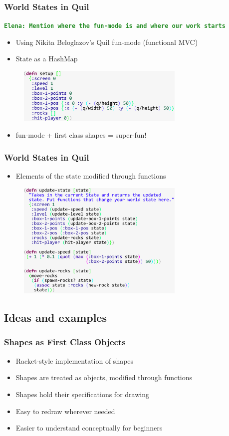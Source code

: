 \documentclass{beamer}
\newcommand{\comment}[1]{{\bf \tt  {#1}}}
\newcommand{\emcomment}[1]{\textcolor{ForestGreen}{\comment{Elena: {#1}}}}
\begin{document}
\begin{frame}
\frametitle{World States in Quil}
\emcomment{Mention where the fun-mode is and where our work starts}
	\begin{itemize}
		\item  Using Nikita Beloglazov's  Quil fun-mode (functional MVC)
		\item State as a HashMap
	\end{itemize}
	\begin{figure}
		\includegraphics[width=8cm]{PresentationImages/setupCode.pdf}
	\end{figure}
	\begin{itemize}
		\item fun-mode + first class shapes = super-fun!
	\end{itemize}
\end{frame}

\begin{frame}
\frametitle{World States in Quil}
\begin{itemize}
		\item Elements of the state modified through functions
	\end{itemize}
	\begin{figure}
		\includegraphics[width=8cm]{PresentationImages/updateCode.pdf}
	\end{figure}
\end{frame}


\subsection{Ideas and examples}


\begin{frame}
\frametitle{Shapes as First Class Objects}
	\begin{itemize}
		\item Racket-style implementation of shapes
		\item Shapes are treated as objects, modified through functions
		\item Shapes hold their specifications for drawing
		\item Easy to redraw wherever needed
		\item Easier to understand conceptually for beginners
	\end{itemize}
\end{frame}
\end{document}
